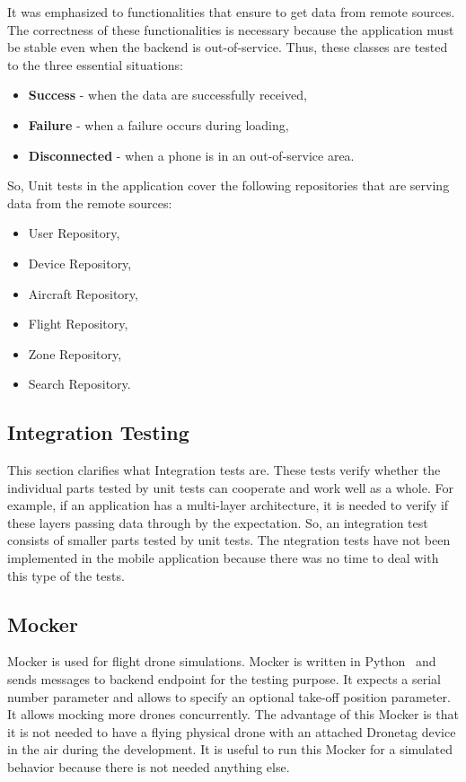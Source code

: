 It was emphasized to functionalities that ensure to get data from remote sources.
The correctness of these functionalities is necessary because the application must be stable even when the backend is out-of-service.
Thus, these classes are tested to the three essential situations:
\begin{itemize}
    \item \textbf{Success} - when the data are successfully received,
    \item \textbf{Failure} - when a failure occurs during loading,
    \item \textbf{Disconnected} - when a phone is in an out-of-service area.
\end{itemize}
So, Unit tests in the application cover the following repositories that are serving data from the remote sources:
\begin{itemize}
    \item User Repository,
    \item Device Repository,
    \item Aircraft Repository,
    \item Flight Repository,
    \item Zone Repository,
    \item Search Repository.
\end{itemize}


\subsection{Integration Testing}\label{subsec:integration-testing}
This section clarifies what Integration tests are.
These tests verify whether the individual parts tested by unit tests can cooperate and work well as a whole.
For example, if an application has a multi-layer architecture, it is needed to verify if these layers passing data through by the expectation.
So, an integration test consists of smaller parts tested by unit tests.
The ntegration tests have not been implemented in the mobile application because there was no time to deal with this type of the tests.


\subsection{Mocker}\label{subsec:mocker}
Mocker is used for flight drone simulations.
Mocker is written in Python~\cite{python} and sends messages to backend endpoint for the testing purpose.
It expects a serial number parameter and allows to specify an optional take-off position parameter.
It allows mocking more drones concurrently.
The advantage of this Mocker is that it is not needed to have a flying physical drone with an attached Dronetag device in the air during the development.
It is useful to run this Mocker for a simulated behavior because there is not needed anything else.
